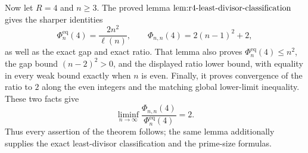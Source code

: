 Now let \(R=4\) and \(n\ge3\). The proved lemma \(\textnormal{lem:r4-least-divisor-classification}\) gives the sharper identities
\[
\Phi_n^{\mathrm{eq}}(4)=\frac{2n^2}{\ell(n)},
\qquad
\Phi_{n,n}(4)=2(n-1)^2+2,
\]
as well as the exact gap and exact ratio. That lemma also proves \(\Phi_n^{\mathrm{eq}}(4)\le n^2\), the gap bound \((n-2)^2>0\), and the displayed ratio lower bound, with equality in every weak bound exactly when \(n\) is even. Finally, it proves convergence of the ratio to \(2\) along the even integers and the matching global lower-limit inequality. These two facts give
\[
\liminf_{n\to\infty}
\frac{\Phi_{n,n}(4)}{\Phi_n^{\mathrm{eq}}(4)}=2.
\]
Thus every assertion of the theorem follows; the same lemma additionally supplies the exact least-divisor classification and the prime-size formulas.
